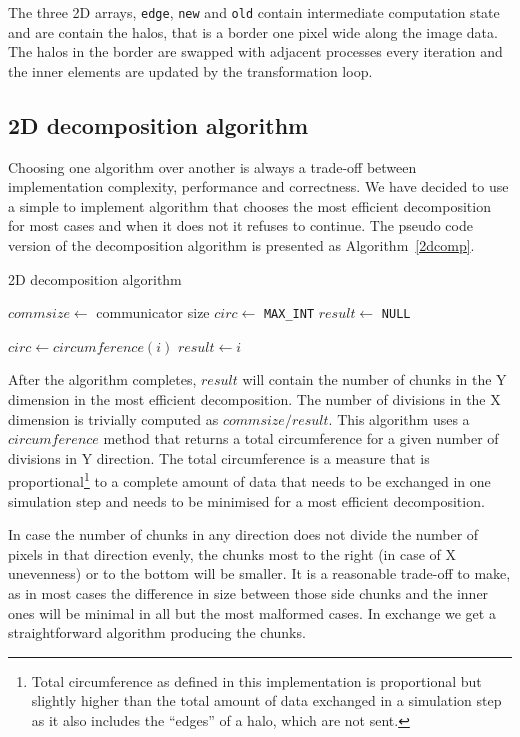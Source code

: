 \documentclass[11pt,a4paper]{article}
\begin{document}
The three 2D arrays, \texttt{edge}, \texttt{new} and \texttt{old} contain intermediate computation state and are contain the halos, that is a border one pixel wide along the image data. The halos in the border are swapped with adjacent processes every iteration and the inner elements are updated by the transformation loop.

\subsection{2D decomposition algorithm}
\label{sec:2ddec}
Choosing one algorithm over another is always a trade-off between implementation complexity, performance and correctness. We have decided to use a simple to implement algorithm that chooses the most efficient decomposition for most cases and when it does not it refuses to continue. The pseudo code version of the decomposition algorithm is presented as Algorithm~\ref{2dcomp}.

\begin{algorithm}
    \caption{2D decomposition algorithm}\label{2dcomp}
    \begin{algorithmic}[1]
        \State $commsize\gets$ communicator size
        \State $circ\gets$ \texttt{MAX\_INT}
        \State $result\gets$ \texttt{NULL}

                \State $circ\gets circumference(i)$
                \State $result\gets i$
            \EndIf
        \EndFor
    \end{algorithmic}
\end{algorithm}

After the algorithm completes, $result$ will contain the number of chunks in the Y dimension in the most efficient decomposition. The number of divisions in the X dimension is trivially computed as $commsize / result$. This algorithm uses a $circumference$ method that returns a total circumference for a given number of divisions in Y direction. The total circumference is a measure that is proportional\footnote{Total circumference as defined in this implementation is proportional but slightly higher than the total amount of data exchanged in a simulation step as it also includes the ``edges'' of a halo, which are not sent.} to a complete amount of data that needs to be exchanged in one simulation step and needs to be minimised for a most efficient decomposition. 

In case the number of chunks in any direction does not divide the number of pixels in that direction evenly, the chunks most to the right (in case of X unevenness) or to the bottom will be smaller. It is a reasonable trade-off to make, as in most cases the difference in size between those side chunks and the inner ones will be minimal in all but the most malformed cases. In exchange we get a straightforward algorithm producing the chunks.
\end{document}
